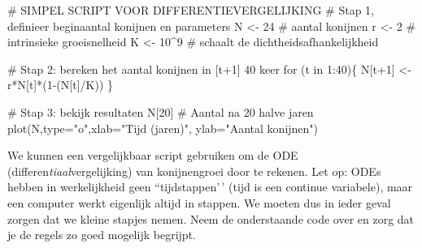 \documentclass[
  a4paper,
]{scrbook}
\newenvironment{Shaded}{\begin{snugshade}}{\end{snugshade}}
\newcommand{\AttributeTok}[1]{\textcolor[rgb]{0.40,0.45,0.13}{#1}}
\newcommand{\CommentTok}[1]{\textcolor[rgb]{0.37,0.37,0.37}{#1}}
\newcommand{\ControlFlowTok}[1]{\textcolor[rgb]{0.00,0.23,0.31}{#1}}
\newcommand{\DecValTok}[1]{\textcolor[rgb]{0.68,0.00,0.00}{#1}}
\newcommand{\FunctionTok}[1]{\textcolor[rgb]{0.28,0.35,0.67}{#1}}
\newcommand{\NormalTok}[1]{\textcolor[rgb]{0.00,0.23,0.31}{#1}}
\newcommand{\OtherTok}[1]{\textcolor[rgb]{0.00,0.23,0.31}{#1}}
\newcommand{\SpecialCharTok}[1]{\textcolor[rgb]{0.37,0.37,0.37}{#1}}
\newcommand{\StringTok}[1]{\textcolor[rgb]{0.13,0.47,0.30}{#1}}
\theoremstyle{definition}
\theoremstyle{remark}
\begin{document}
\begin{Shaded}
\begin{Highlighting}[]
\CommentTok{\# SIMPEL SCRIPT VOOR DIFFERENTIEVERGELIJKING}
\CommentTok{\# Stap 1, definieer beginaantal konijnen en parameters}
\NormalTok{N }\OtherTok{\textless{}{-}} \DecValTok{24}    \CommentTok{\# aantal konijnen}
\NormalTok{r }\OtherTok{\textless{}{-}} \DecValTok{2}     \CommentTok{\# intrinsieke groeisnelheid}
\NormalTok{K }\OtherTok{\textless{}{-}} \DecValTok{10}\SpecialCharTok{\^{}}\DecValTok{9}  \CommentTok{\# schaalt de dichtheidsafhankelijkheid}

\CommentTok{\# Stap 2: bereken het aantal konijnen in [t+1] 40 keer}
\ControlFlowTok{for}\NormalTok{ (t }\ControlFlowTok{in} \DecValTok{1}\SpecialCharTok{:}\DecValTok{40}\NormalTok{)\{}
\NormalTok{  N[t}\SpecialCharTok{+}\DecValTok{1}\NormalTok{] }\OtherTok{\textless{}{-}}\NormalTok{ r}\SpecialCharTok{*}\NormalTok{N[t]}\SpecialCharTok{*}\NormalTok{(}\DecValTok{1}\SpecialCharTok{{-}}\NormalTok{(N[t]}\SpecialCharTok{/}\NormalTok{K))}
\NormalTok{\}}

\CommentTok{\# Stap 3: bekijk resultaten}
\NormalTok{N[}\DecValTok{20}\NormalTok{] }\CommentTok{\# Aantal na 20 halve jaren}
\FunctionTok{plot}\NormalTok{(N,}\AttributeTok{type=}\StringTok{"o"}\NormalTok{,}\AttributeTok{xlab=}\StringTok{"Tijd (jaren)"}\NormalTok{, }\AttributeTok{ylab=}\StringTok{"Aantal konijnen"}\NormalTok{)}
\end{Highlighting}
\end{Shaded}

We kunnen een vergelijkbaar script gebruiken om de ODE
(differen\emph{tiaal}vergelijking) van konijnengroei door te rekenen.
Let op: ODEs hebben in werkelijkheid geen ``tijdstappen'\,' (tijd is een
continue variabele), maar een computer werkt eigenlijk altijd in
stappen. We moeten dus in ieder geval zorgen dat we kleine stapjes
nemen. Neem de onderstaande code over en zorg dat je de regels zo goed
mogelijk begrijpt.
\end{document}
